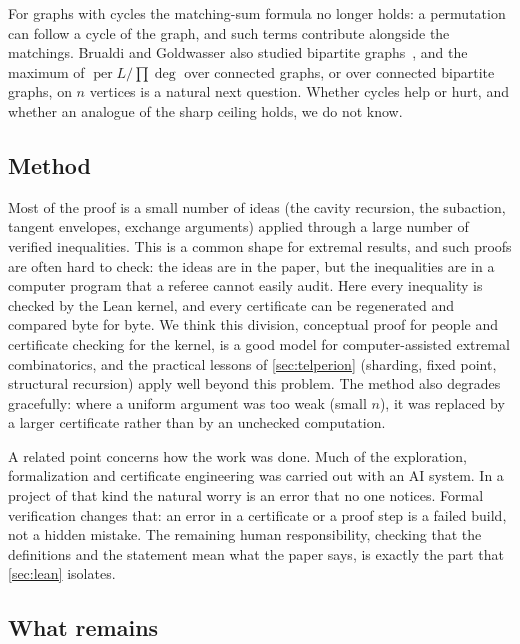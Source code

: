 \documentclass[11pt]{article}
\theoremstyle{definition}
\newcommand{\per}{\operatorname{per}}
\renewcommand{\deg}{\operatorname{deg}}
\begin{document}
For graphs with cycles the matching-sum formula no longer holds: a permutation can follow a cycle of the
graph, and such terms contribute alongside the matchings. Brualdi and Goldwasser also studied bipartite
graphs~\cite{BG1984}, and the maximum of $\per L/\prod\deg$ over connected graphs, or over connected
bipartite graphs, on $n$ vertices is a natural next question. Whether cycles help or hurt, and whether an
analogue of the sharp ceiling holds, we do not know.

\subsection{Method}

Most of the proof is a small number of ideas (the cavity recursion, the subaction, tangent envelopes,
exchange arguments) applied through a large number of verified inequalities. This is a common shape for
extremal results, and such proofs are often hard to check: the ideas are in the paper, but the
inequalities are in a computer program that a referee cannot easily audit. Here every inequality is
checked by the Lean kernel, and every certificate can be regenerated and compared byte for byte. We think
this division, conceptual proof for people and certificate checking for the kernel, is a good model for
computer-assisted extremal combinatorics, and the practical lessons of \cref{sec:telperion} (sharding,
fixed point, structural recursion) apply well beyond this problem. The method also degrades gracefully:
where a uniform argument was too weak (small $n$), it was replaced by a larger certificate rather than
by an unchecked computation.

A related point concerns how the work was done. Much of the exploration, formalization and certificate
engineering was carried out with an AI system. In a project of that kind the natural worry is an
error that no one notices. Formal verification changes that: an error in a certificate or a proof step
is a failed build, not a hidden mistake. The remaining human responsibility, checking that the
definitions and the statement mean what the paper says, is exactly the part that \cref{sec:lean} isolates.

\subsection{What remains}
\end{document}
